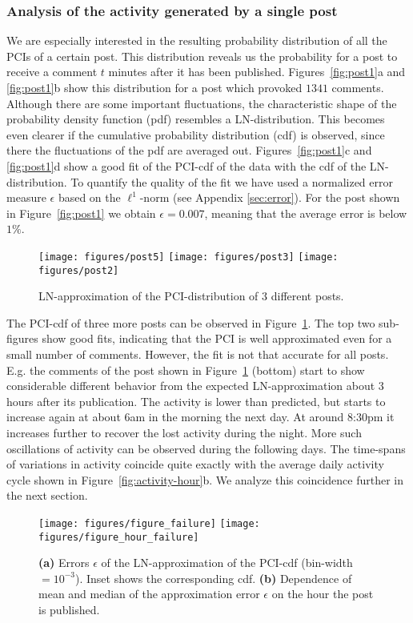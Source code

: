 \documentclass[twoside,11pt]{article}
\begin{document}
\subsubsection{Analysis of the activity generated by a single post} \noindent 
We are especially interested in the resulting probability distribution
of all the PCIs of a certain post. This distribution reveals us the
probability for a post to receive a comment $t$ minutes after it has
been published.  Figures~\ref{fig:post1}a and \ref{fig:post1}b show
this distribution for a post which provoked $1341$ comments.  Although
there are some important fluctuations, the characteristic shape of the
probability density function (pdf) resembles a LN-distribution.  This
becomes even clearer if the cumulative probability distribution (cdf)
is observed, since there the fluctuations of the pdf are averaged out.
Figures~\ref{fig:post1}c and \ref{fig:post1}d show a good fit of the
PCI-cdf of the data with the cdf of the LN-distribution.  To quantify
the quality of the fit we have used a normalized error measure
$\epsilon$ based on the $\ell^1$-norm (see Appendix \ref{sec:error}).
For the post shown in Figure~\ref{fig:post1} we obtain
$\epsilon=0.007$, meaning that the average error is below $1\%$.

\begin{figure}[!tb]\centering
  \texttt{[image: figures/post5]}
  \texttt{[image: figures/post3]}
  \texttt{[image: figures/post2]}
  \caption{LN-approximation of the PCI-distribution of $3$
    different posts.}
\label{fig:posts}
\end{figure}

The PCI-cdf of three more posts can be observed in
Figure~\ref{fig:posts}. The top two sub-figures show good fits,
indicating that the PCI is well approximated even for a small number
of comments.  However, the fit is not that accurate for all posts.
E.g. the comments of the post shown in Figure~\ref{fig:posts} (bottom)
start to show considerable different behavior from the expected
LN-approximation about $3$ hours after its publication.  The activity
is lower than predicted, but starts to increase again at about $6$am
in the morning the next day. At around $8$:$30$pm it increases further
to recover the lost activity during the night. More such oscillations
of activity can be observed during the following days. The time-spans
of variations in activity coincide quite exactly with the average
daily activity cycle shown in Figure~\ref{fig:activity-hour}b.  We
analyze this coincidence further in the next section.
 \begin{figure}[!t]\centering
   \texttt{[image: figures/figure\_failure]}
   \texttt{[image: figures/figure\_hour\_failure]}
   \caption{\textbf{(a)} Errors $\epsilon$ of the LN-approximation of
     the PCI-cdf (bin-width $=10^{-3}$). Inset shows the corresponding
     cdf.  
     \textbf{(b)} Dependence of mean and median of the approximation
     error $\epsilon$ on the hour the post is published.}
\label{fig:hour_failure}
\label{fig:hist_failure}
\end{figure}
\end{document}
